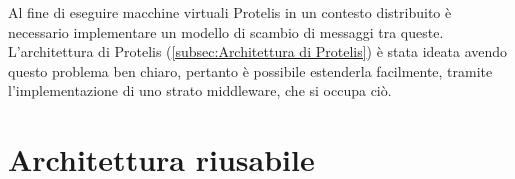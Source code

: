 Al fine di eseguire macchine virtuali Protelis in un contesto distribuito è
necessario implementare un modello di scambio di messaggi tra queste.
L'architettura di Protelis (\ref{subsec:Architettura di Protelis}) è stata ideata avendo questo problema ben chiaro,
pertanto è possibile estenderla facilmente, tramite l'implementazione di uno
strato middleware, che si occupa ciò.

%

\section{Architettura riusabile}
%
